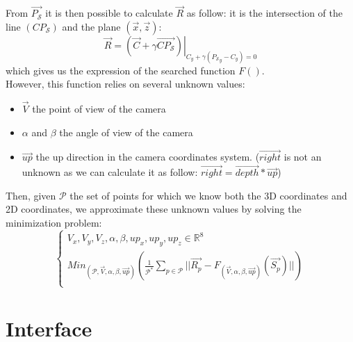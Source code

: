 From $\overrightarrow{P_{\mathcal{S}}}$ it is then possible to calculate $\overrightarrow{R}$ as follow: it is the intersection of the line $(CP_{\mathcal{S}})$ and the plane $(\overrightarrow{x},\overrightarrow{z})$:\\
\begin{equation}
\overrightarrow{R}=\left.(\overrightarrow{C}+\gamma\overrightarrow{CP_{\mathcal{S}}})\right|_{C_y+\gamma ({P_{\mathcal{S}}}_y-C_y)=0}
\end{equation}
which gives us the expression of the searched function $F()$.\\

However, this function relies on several unknown values:\\
\begin{itemize}
\item $\overrightarrow{V}$ the point of view of the camera
\item $\alpha$ and $\beta$ the angle of view of the camera
\item $\overrightarrow{up}$ the up direction in the camera coordinates system. ($\overrightarrow{right}$ is not an unknown as we can calculate it as follow: $\overrightarrow{right}=\overrightarrow{depth}*\overrightarrow{up}$)
\end{itemize}

Then, given $\mathcal{P}$ the set of points for which we know both the 3D coordinates and 2D coordinates, we approximate these unknown values by solving the minimization problem:\\
\begin{equation}
\left\lbrace
\begin{array}{l}
{V_x,V_y,V_z,\alpha,\beta,up_x,up_y,up_z}\in\mathbb{R}^8\\
Min_{(\mathcal{P},\overrightarrow{V},\alpha,\beta,\overrightarrow{up})}(\frac{1}{\mathcal{P}^*}\sum_{p\in\mathcal{P}}||\overrightarrow{R_p}-F_{(\overrightarrow{V},\alpha,\beta,\overrightarrow{up})}(\overrightarrow{S_p})||)\\
\end{array}
\right.
\end{equation}

\section{Interface}

\begin{scriptsize}
\begin{ttfamily}

\end{ttfamily}
\end{scriptsize}

